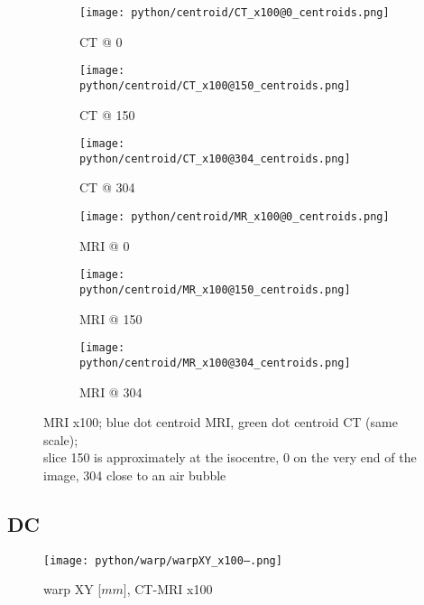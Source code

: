 \begin{figure}[!tbp]
  \begin{subfigure}[b]{0.32\textwidth}
    \texttt{[image: python/centroid/CT\_x100@0\_centroids.png]}
    \caption{CT @ 0}
    \label{fig:CT_x100_centroids@0}
  \end{subfigure}
  \begin{subfigure}[b]{0.32\textwidth}
    \texttt{[image: python/centroid/CT\_x100@150\_centroids.png]}
    \caption{CT @ 150}
    \label{fig:CT_x100_centroids@150}
  \end{subfigure}
  \begin{subfigure}[b]{0.32\textwidth}
    \texttt{[image: python/centroid/CT\_x100@304\_centroids.png]}
    \caption{CT @ 304}
    \label{fig:CT_x100_centroids@304}
  \end{subfigure}
  \begin{subfigure}[b]{0.32\textwidth}
    \texttt{[image: python/centroid/MR\_x100@0\_centroids.png]}
    \caption{MRI @ 0}
    \label{fig:MR_x100_centroids@0}
  \end{subfigure}
  \begin{subfigure}[b]{0.32\textwidth}
    \texttt{[image: python/centroid/MR\_x100@150\_centroids.png]}
    \caption{MRI @ 150}
    \label{fig:MR_x100_centroids@150}
  \end{subfigure}
  \begin{subfigure}[b]{0.32\textwidth}
    \texttt{[image: python/centroid/MR\_x100@304\_centroids.png]}
    \caption{MRI @ 304}
    \label{fig:MR_x100_centroids@304}
  \end{subfigure}
  \caption{MRI x100; blue dot centroid MRI, green dot centroid CT (same scale);\\ slice 150 is approximately at the isocentre, 0 on the very end of the image, 304 close to an air bubble}
  \label{fig:MR_x100_centroids}
\end{figure}

\clearpage

\subsection{DC}

\begin{figure}[!bp]
  \centering
  \texttt{[image: python/warp/warpXY\_x100--.png]}
  \caption{warp XY [$mm$], CT-MRI x100}
  \label{fig:warpXY_x100}
\end{figure}

